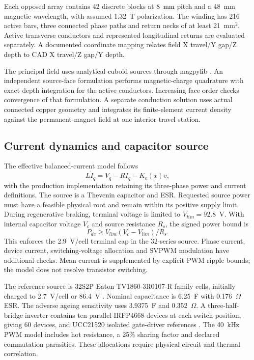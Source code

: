 \documentclass[conference,a4paper]{IEEEtran}
\begin{document}
Each opposed array contains 42 discrete blocks at 8~mm pitch and a 48~mm magnetic wavelength, with assumed 1.32~T polarization. The winding has 216 active bars, three connected phase paths and return necks of at least 21~mm$^2$. Active transverse conductors and represented longitudinal returns are evaluated separately. A documented coordinate mapping relates field X travel/Y gap/Z depth to CAD X travel/Z gap/Y depth.

The principal field uses analytical cuboid sources through magpylib \cite{magpylib}. An independent source-face formulation performs magnetic-charge quadrature with exact depth integration for the active conductors. Increasing face order checks convergence of that formulation. A separate conduction solution uses actual connected copper geometry and integrates its finite-element current density against the permanent-magnet field at one interior travel station.

\subsection{Current dynamics and capacitor source}
The effective balanced-current model follows
\begin{equation}
L\dot I_q=V_q-RI_q-K_e(x)v,
\label{eq:current}
\end{equation}
with the production implementation retaining its three-phase power and current definitions. The source is a Thevenin capacitor and ESR. Requested source power must have a feasible physical root and remain within its positive supply limit. During regenerative braking, terminal voltage is limited to $V_{lim}=92.8$~V. With internal capacitor voltage $V_c$ and source resistance $R_s$, the signed power bound is
\begin{equation}
P_{dc}\geq V_{lim}(V_c-V_{lim})/R_s.
\label{eq:regen}
\end{equation}
This enforces the 2.9~V/cell terminal cap in the 32-series source. Phase current, device current, switching-voltage allocation and SVPWM modulation have additional checks. Mean current is supplemented by explicit PWM ripple bounds; the model does not resolve transistor switching.

The reference source is 32S2P Eaton TV1860-3R0107-R family cells, initially charged to 2.7~V/cell or 86.4~V \cite{eaton}. Nominal capacitance is 6.25~F with 0.176~$\Omega$ ESR. The adverse ageing sensitivity uses 3.9375~F and 0.352~$\Omega$. A three-half-bridge inverter contains ten parallel IRFP4668 devices at each switch position, giving 60 devices, and UCC21520 isolated gate-driver references \cite{mosfet,driver}. The 40~kHz PWM model includes hot resistance, a 25\% sharing factor and declared commutation parasitics. These allocations require physical circuit and thermal correlation.
\end{document}
